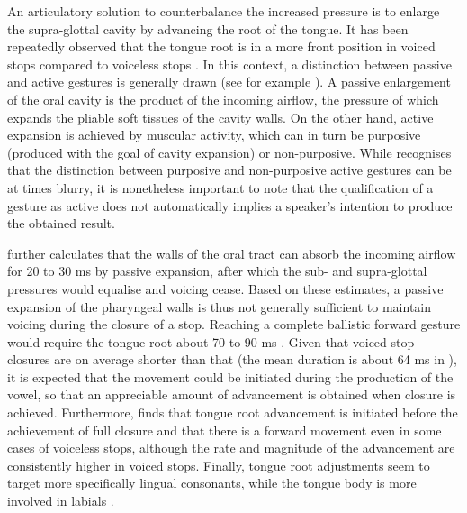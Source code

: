 \documentclass[12pt,]{article}
\begin{document}
An articulatory solution to counterbalance the increased pressure is to
enlarge the supra-glottal cavity by advancing the root of the tongue. It
has been repeatedly observed that the tongue root is in a more front
position in voiced stops compared to voiceless stops
\citep{kent1969, perkell1969, westbury1983}. In this context, a
distinction between passive and active gestures is generally drawn (see
for example \citealt{rothenberg1967}). A passive enlargement of the oral
cavity is the product of the incoming airflow, the pressure of which
expands the pliable soft tissues of the cavity walls. On the other hand,
active expansion is achieved by muscular activity, which can in turn be
purposive (produced with the goal of cavity expansion) or non-purposive.
While \citet{rothenberg1967} recognises that the distinction between
purposive and non-purposive active gestures can be at times blurry, it
is nonetheless important to note that the qualification of a gesture as
active does not automatically implies a speaker's intention to produce
the obtained result.

\citet{rothenberg1967} further calculates that the walls of the oral
tract can absorb the incoming airflow for 20 to 30 ms by passive
expansion, after which the sub- and supra-glottal pressures would
equalise and voicing cease. Based on these estimates, a passive
expansion of the pharyngeal walls is thus not generally sufficient to
maintain voicing during the closure of a stop. Reaching a complete
ballistic forward gesture would require the tongue root about 70 to 90
ms \citep{rothenberg1967}. Given that voiced stop closures are on
average shorter than that (the mean duration is about 64 ms in
\citealt{luce1985}), it is expected that the movement could be initiated
during the production of the vowel, so that an appreciable amount of
advancement is obtained when closure is achieved. Furthermore,
\citet{westbury1983} finds that tongue root advancement is initiated
before the achievement of full closure and that there is a forward
movement even in some cases of voiceless stops, although the rate and
magnitude of the advancement are consistently higher in voiced stops.
Finally, tongue root adjustments seem to target more specifically
lingual consonants, while the tongue body is more involved in labials
\citep{perkell1969, westbury1983}.
\end{document}
